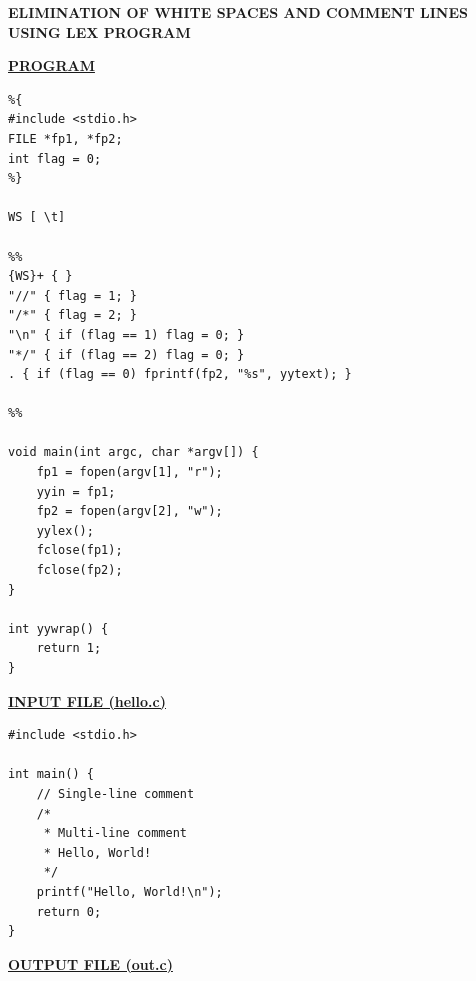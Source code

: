 \documentclass[10pt]{article}
\begin{document}
\noindent
\makebox[\textwidth]{\dotfill}

\vspace{0.05cm}

\begin{center}
    \textbf{ELIMINATION OF WHITE SPACES AND COMMENT LINES USING LEX PROGRAM}
\end{center}

\vspace{0.05cm}

\noindent
\makebox[\textwidth]{\dotfill}

\vspace{0.15cm}

\noindent
\underline{\textbf{PROGRAM}}

\vspace{0.1cm}

\begin{lstlisting}
%{
#include <stdio.h>
FILE *fp1, *fp2;
int flag = 0;
%}

WS [ \t]

%%
{WS}+ { }
"//" { flag = 1; }
"/*" { flag = 2; }
"\n" { if (flag == 1) flag = 0; }
"*/" { if (flag == 2) flag = 0; }
. { if (flag == 0) fprintf(fp2, "%s", yytext); }

%%

void main(int argc, char *argv[]) {
    fp1 = fopen(argv[1], "r");
    yyin = fp1;
    fp2 = fopen(argv[2], "w");
    yylex();
    fclose(fp1);
    fclose(fp2);
}

int yywrap() {
    return 1;
}
\end{lstlisting}

\vspace{0.15cm}

\noindent
\underline{\textbf{INPUT FILE (hello.c)}}

\vspace{0.1cm}

\begin{lstlisting}
#include <stdio.h>

int main() {
    // Single-line comment
    /*
     * Multi-line comment
     * Hello, World!
     */
    printf("Hello, World!\n");
    return 0;
}

\end{lstlisting}

\vspace{0.15cm}

\noindent
\underline{\textbf{OUTPUT FILE (out.c)}}

\vspace{0.1cm}
\end{document}
